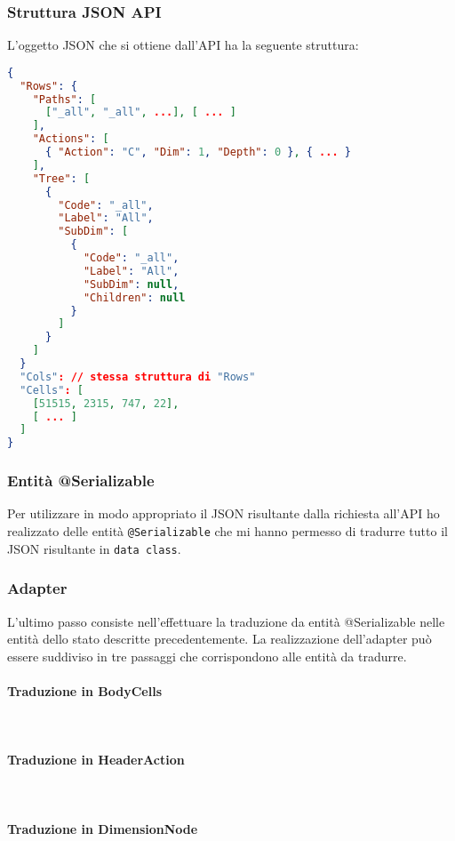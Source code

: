\subsubsection{Struttura JSON API}
L'oggetto JSON che si ottiene dall'API ha la seguente struttura:
\begin{lstlisting}[caption={BodyCells}, label={lst:bodycells}, language=json]
{
  "Rows": {
  	"Paths": [
  	  ["_all", "_all", ...], [ ... ]
  	],
  	"Actions": [
  	  { "Action": "C", "Dim": 1, "Depth": 0 }, { ... }
  	],
  	"Tree": [
  	  {
  	    "Code": "_all",
  	    "Label": "All",
  	    "SubDim": [
  	      {
  	        "Code": "_all",
  	        "Label": "All",
  	        "SubDim": null,
  	        "Children": null
  	      }
  	    ]  
  	  }
  	]
  }
  "Cols": // stessa struttura di "Rows"
  "Cells": [
    [51515, 2315, 747, 22],
    [ ... ]
  ]
}
\end{lstlisting}

\subsubsection{Entità @Serializable}
Per utilizzare in modo appropriato il JSON risultante dalla richiesta all'API ho realizzato delle entità \verb|@Serializable| che mi hanno permesso di tradurre tutto il JSON risultante in \verb|data class|.

\subsubsection{Adapter}
L'ultimo passo consiste nell'effettuare la traduzione da entità @Serializable nelle entità dello stato descritte precedentemente. La realizzazione dell'adapter può essere suddiviso in tre passaggi che corrispondono alle entità da tradurre.

\paragraph{Traduzione in BodyCells}\mbox{} \\
\paragraph{Traduzione in HeaderAction}\mbox{} \\
\paragraph{Traduzione in DimensionNode}\mbox{} \\


